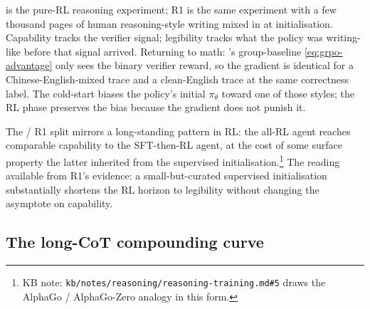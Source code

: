 \begin{intuition}
 is the pure-RL reasoning experiment; R1 is the same
experiment with a few thousand pages of human reasoning-style writing
mixed in at initialisation. Capability tracks the verifier signal;
legibility tracks what the policy was writing-like before that
signal arrived. Returning to math: 's group-baseline
\cref{eq:grpo-advantage} only sees the binary verifier reward, so the
gradient is identical for a Chinese-English-mixed trace and a
clean-English trace at the same correctness label. The cold-start
biases the policy's initial $\pi_\theta$ toward one of those styles;
the RL phase preserves the bias because the gradient does not punish
it.
\end{intuition}

The  / R1 split mirrors a long-standing pattern in RL: the
all-RL agent reaches comparable capability to the SFT-then-RL agent,
at the cost of some surface property the latter inherited from the
supervised initialisation.\footnote{KB note:
\nolinkurl{kb/notes/reasoning/reasoning-training.md#5} draws the
AlphaGo / AlphaGo-Zero analogy in this form.} The reading available
from R1's evidence: a small-but-curated supervised initialisation
substantially shortens the RL horizon to legibility without changing
the asymptote on capability.

\subsection{The long-CoT compounding curve}
\label{sec:r1-compounding}


